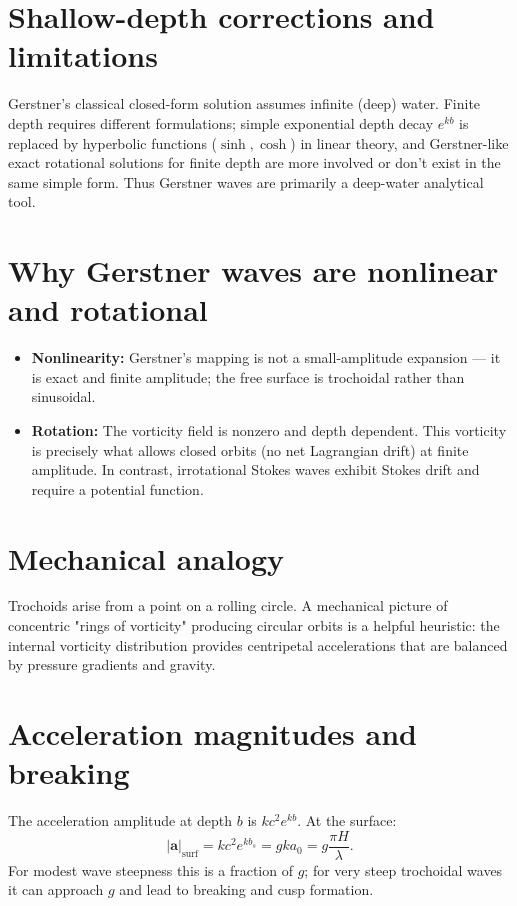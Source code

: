 \documentclass[11pt,letterpaper]{article}
\begin{document}
\section{Shallow-depth corrections and limitations}
Gerstner’s classical closed-form solution assumes infinite (deep) water. Finite depth requires different formulations; simple exponential depth decay $e^{kb}$ is replaced by hyperbolic functions ($\sinh, \cosh$) in linear theory, and Gerstner-like exact rotational solutions for finite depth are more involved or don't exist in the same simple form. Thus Gerstner waves are primarily a deep-water analytical tool.

\section{Why Gerstner waves are nonlinear and rotational}
\begin{itemize}
\item \textbf{Nonlinearity:} Gerstner’s mapping is not a small-amplitude expansion — it is exact and finite amplitude; the free surface is trochoidal rather than sinusoidal.
\item \textbf{Rotation:} The vorticity field is nonzero and depth dependent. This vorticity is precisely what allows closed orbits (no net Lagrangian drift) at finite amplitude. In contrast, irrotational Stokes waves exhibit Stokes drift and require a potential function.
\end{itemize}

\section{Mechanical analogy}
Trochoids arise from a point on a rolling circle. A mechanical picture of concentric "rings of vorticity" producing circular orbits is a helpful heuristic: the internal vorticity distribution provides centripetal accelerations that are balanced by pressure gradients and gravity.

\section{Acceleration magnitudes and breaking}
The acceleration amplitude at depth $b$ is $k c^2 e^{k b}$. At the surface:
\[
|\mathbf{a}|_{\mathrm{surf}} = k c^2 e^{k b_s} = g k a_0 = g\frac{\pi H}{\lambda}.
\]
For modest wave steepness this is a fraction of $g$; for very steep trochoidal waves it can approach $g$ and lead to breaking and cusp formation.
\end{document}

